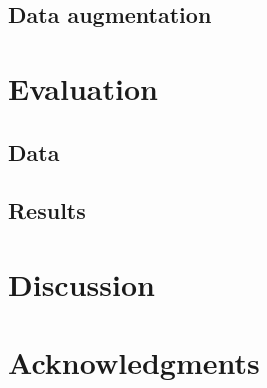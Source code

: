 \documentclass{article}
\begin{document}
\cite{ejh2015four}

%

\subsection{Data augmentation}


\cite{mcfee2015software}

\section{Evaluation}

\subsection{Data}

\cite{humphrey2015four}

\cite{librosa050}

\cite{kingma2014adam}
\cite{chollet2015keras, tensorflow2015-whitepaper}



\subsection{Results}

\section{Discussion}

\section*{Acknowledgments}


\end{document}
